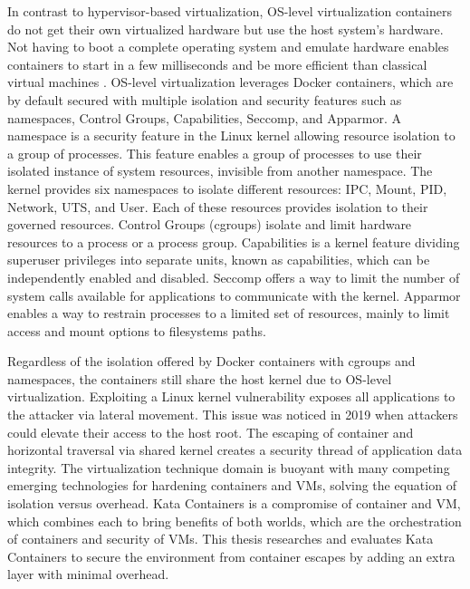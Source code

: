 In contrast to hypervisor-based virtualization, OS-level virtualization containers do not get their own virtualized hardware but use the host system's hardware. Not having to boot a complete operating system and emulate hardware enables containers to start in a few milliseconds and be more efficient than classical virtual machines \cite{Eder2016}. OS-level virtualization leverages Docker containers, which are by default secured with multiple isolation and security features such as namespaces, Control Groups, Capabilities, Seccomp, and Apparmor. A namespace is a security feature in the Linux kernel allowing resource isolation to a group of processes. This feature enables a group of processes to use their isolated instance of system resources, invisible from another namespace. The kernel provides six namespaces to isolate different resources: IPC, Mount, PID, Network, UTS, and User. Each of these resources provides isolation to their governed resources. Control Groups (cgroups) isolate and limit hardware resources to a process or a process group. Capabilities is a kernel feature dividing superuser privileges into separate units, known as capabilities, which can be independently enabled and disabled. Seccomp offers a way to limit the number of system calls available for applications to communicate with the kernel. Apparmor enables a way to restrain processes to a limited set of resources, mainly to limit access and mount options to filesystems paths. \cite{Flauzac2020}\cite{Gao2017}

Regardless of the isolation offered by Docker containers with cgroups and namespaces, the containers still share the host kernel due to OS-level virtualization. Exploiting a Linux kernel vulnerability exposes all applications to the attacker via lateral movement. This issue was noticed in 2019 \cite{CVE-2020-14386}\cite{CVE-2019-5736} when attackers could elevate their access to the host root. The escaping of container and horizontal traversal via shared kernel creates a security thread of application data integrity. The virtualization technique domain is buoyant with many competing emerging technologies for hardening containers and VMs, solving the equation of isolation versus overhead. Kata Containers is a compromise of container and VM, which combines each to bring benefits of both worlds, which are the orchestration of containers and security of VMs. This thesis researches and evaluates Kata Containers to secure the environment from container escapes by adding an extra layer with minimal overhead. \cite{EdgeComputing5G}

